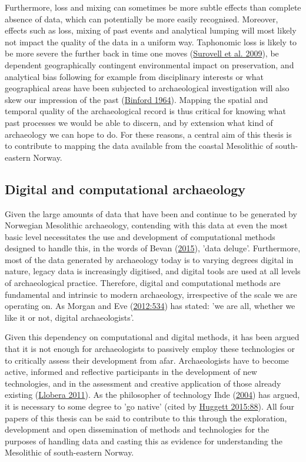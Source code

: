 \documentclass[
  12pt,
  a4paper,
  oneside]{book}
\begin{document}
Furthermore, loss and mixing can sometimes be more subtle effects than complete absence of data, which can potentially be more easily recognised. Moreover, effects such as loss, mixing of past events and analytical lumping will most likely not impact the quality of the data in a uniform way. Taphonomic loss is likely to be more severe the further back in time one moves (\protect\hyperlink{ref-surovell2009a}{Surovell et al. 2009}), be dependent geographically contingent environmental impact on preservation, and analytical bias following for example from disciplinary interests or what geographical areas have been subjected to archaeological investigation will also skew our impression of the past (\protect\hyperlink{ref-binford1964}{Binford 1964}). Mapping the spatial and temporal quality of the archaeological record is thus critical for knowing what past processes we would be able to discern, and by extension what kind of archaeology we can hope to do. For these reasons, a central aim of this thesis is to contribute to mapping the data available from the coastal Mesolithic of south-eastern Norway.

\hypertarget{digital-and-computational-archaeology}{%
\subsection{Digital and computational archaeology}\label{digital-and-computational-archaeology}}

Given the large amounts of data that have been and continue to be generated by Norwegian Mesolithic archaeology, contending with this data at even the most basic level necessitates the use and development of computational methods designed to handle this, in the words of Bevan (\protect\hyperlink{ref-bevan2015}{2015}), 'data deluge'. Furthermore, most of the data generated by archaeology today is to varying degrees digital in nature, legacy data is increasingly digitised, and digital tools are used at all levels of archaeological practice. Therefore, digital and computational methods are fundamental and intrinsic to modern archaeology, irrespective of the scale we are operating on. As Morgan and Eve (\protect\hyperlink{ref-morgan2012}{2012:534}) has stated: 'we are all, whether we like it or not, digital archaeologists'.

Given this dependency on computational and digital methods, it has been argued that it is not enough for archaeologists to passively employ these technologies or to critically assess their development from afar. Archaeologists have to become active, informed and reflective participants in the development of new technologies, and in the assessment and creative application of those already existing (\protect\hyperlink{ref-llobera2011}{Llobera 2011}). As the philosopher of technology Ihde (\protect\hyperlink{ref-ihde2004}{2004}) has argued, it is necessary to some degree to 'go native' (cited by \protect\hyperlink{ref-huggett2015}{Huggett 2015:88}). All four papers of this thesis can be said to contribute to this through the exploration, development and open dissemination of methods and technologies for the purposes of handling data and casting this as evidence for understanding the Mesolithic of south-eastern Norway.
\end{document}
